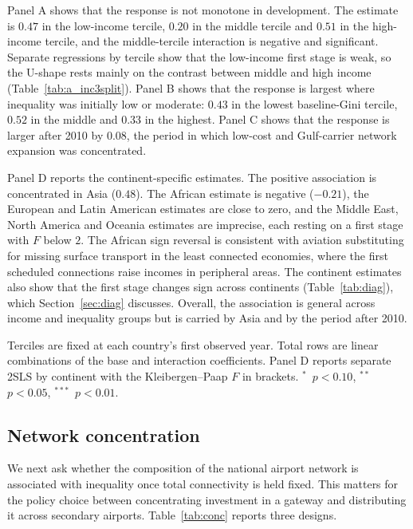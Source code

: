 \documentclass[12pt]{article}
\newcommand{\sym}[1]{\ensuremath{^{#1}}}
\begin{document}
Panel A shows that the response is not monotone in development. The estimate is $0.47$ in the low-income tercile, $0.20$ in the middle tercile and $0.51$ in the high-income tercile, and the middle-tercile interaction is negative and significant. Separate regressions by tercile show that the low-income first stage is weak, so the U-shape rests mainly on the contrast between middle and high income (Table~\ref{tab:a_inc3split}). Panel B shows that the response is largest where inequality was initially low or moderate: $0.43$ in the lowest baseline-Gini tercile, $0.52$ in the middle and $0.33$ in the highest. Panel C shows that the response is larger after 2010 by $0.08$, the period in which low-cost and Gulf-carrier network expansion was concentrated.

Panel D reports the continent-specific estimates. The positive association is concentrated in Asia ($0.48$). The African estimate is negative ($-0.21$), the European and Latin American estimates are close to zero, and the Middle East, North America and Oceania estimates are imprecise, each resting on a first stage with $F$ below $2$. The African sign reversal is consistent with aviation substituting for missing surface transport in the least connected economies, where the first scheduled connections raise incomes in peripheral areas. The continent estimates also show that the first stage changes sign across continents (Table~\ref{tab:diag}), which Section~\ref{sec:diag} discusses. Overall, the association is general across income and inequality groups but is carried by Asia and by the period after 2010.

\begin{table}[H]\centering\caption{Heterogeneity: interaction 2SLS with the Feyrer instrument (robust SE).}\label{tab:hetero}
\begin{threeparttable}\small
\begin{tablenotes}\footnotesize\item Terciles are fixed at each country's first observed year. Total rows are linear combinations of the base and interaction coefficients. Panel D reports separate 2SLS by continent with the Kleibergen--Paap $F$ in brackets. \sym{*}~$p<0.10$, \sym{**}~$p<0.05$, \sym{***}~$p<0.01$.\end{tablenotes}\end{threeparttable}\end{table}

\subsection{Network concentration}
\label{sec:conc}
We next ask whether the composition of the national airport network is associated with inequality once total connectivity is held fixed. This matters for the policy choice between concentrating investment in a gateway and distributing it across secondary airports. Table~\ref{tab:conc} reports three designs.
\end{document}
